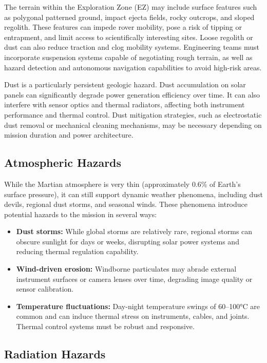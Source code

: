 \documentclass[12pt]{article}
\begin{document}
The terrain within the Exploration Zone (EZ) may include surface features such as polygonal patterned ground, impact ejecta fields, rocky outcrops, and sloped regolith. These features can impede rover mobility, pose a risk of tipping or entrapment, and limit access to scientifically interesting sites. Loose regolith or dust can also reduce traction and clog mobility systems. Engineering teams must incorporate suspension systems capable of negotiating rough terrain, as well as hazard detection and autonomous navigation capabilities to avoid high-risk areas.

Dust is a particularly persistent geologic hazard. Dust accumulation on solar panels can significantly degrade power generation efficiency over time. It can also interfere with sensor optics and thermal radiators, affecting both instrument performance and thermal control. Dust mitigation strategies, such as electrostatic dust removal or mechanical cleaning mechanisms, may be necessary depending on mission duration and power architecture.

\subsection*{Atmospheric Hazards}

While the Martian atmosphere is very thin (approximately 0.6\% of Earth's surface pressure), it can still support dynamic weather phenomena, including dust devils, regional dust storms, and seasonal winds. These phenomena introduce potential hazards to the mission in several ways:

\begin{itemize}
    \item \textbf{Dust storms:} While global storms are relatively rare, regional storms can obscure sunlight for days or weeks, disrupting solar power systems and reducing thermal regulation capability.
    \item \textbf{Wind-driven erosion:} Windborne particulates may abrade external instrument surfaces or camera lenses over time, degrading image quality or sensor calibration.
    \item \textbf{Temperature fluctuations:} Day-night temperature swings of 60--100°C are common and can induce thermal stress on instruments, cables, and joints. Thermal control systems must be robust and responsive.
\end{itemize}

\subsection*{Radiation Hazards}
\end{document}
